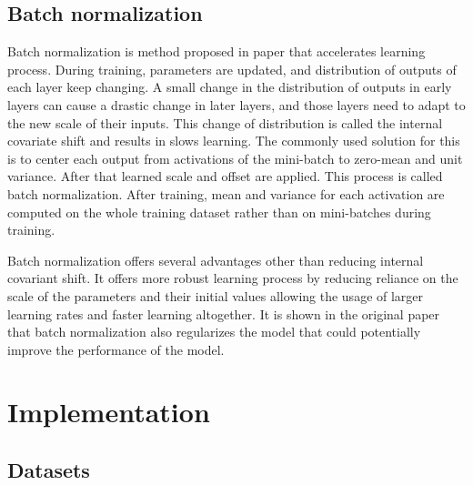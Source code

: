 \documentclass[times, utf8, diplomski, numeric, english]{fer}
\begin{document}
\section{Batch normalization}
Batch normalization is method proposed in paper\cite{BNORM} that accelerates learning process. 
During training, parameters are updated, and distribution of outputs of each layer keep changing. A small change in the distribution of outputs in early layers can cause a drastic change in later layers, and those layers need to adapt to the new scale of their inputs. This change of distribution is called the internal covariate shift and results in slows learning.
The commonly used solution for this is to center each output from activations of the mini-batch to zero-mean and unit variance. After that learned scale and offset are applied. This process is called batch normalization. 
After training, mean and variance for each activation are computed on the whole training dataset rather than on mini-batches during training. 

Batch normalization offers several advantages other than reducing internal covariant shift. 
It offers more robust learning process by reducing reliance on the scale of the parameters and their initial values allowing the usage of larger learning rates and faster learning altogether. It is shown in the original paper that batch normalization also regularizes the model that could potentially improve the performance of the model.

\chapter{Implementation}

\section{Datasets}
\end{document}

